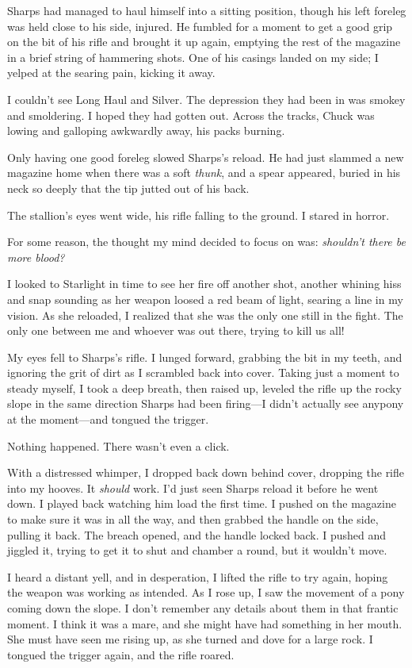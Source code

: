 Sharps had managed to haul himself into a sitting position, though his left foreleg was held close to his side, injured. He fumbled for a moment to get a good grip on the bit of his rifle and brought it up again, emptying the rest of the magazine in a brief string of hammering shots. One of his casings landed on my side; I yelped at the searing pain, kicking it away.

I couldn’t see Long Haul and Silver. The depression they had been in was smokey and smoldering. I hoped they had gotten out. Across the tracks, Chuck was lowing and galloping awkwardly away, his packs burning.

Only having one good foreleg slowed Sharps’s reload. He had just slammed a new magazine home when there was a soft \textit{thunk}, and a spear appeared, buried in his neck so deeply that the tip jutted out of his back.

The stallion’s eyes went wide, his rifle falling to the ground. I stared in horror.

For some reason, the thought my mind decided to focus on was: \textit{shouldn’t there be more blood?}

I looked to Starlight in time to see her fire off another shot, another whining hiss and snap sounding as her weapon loosed a red beam of light, searing a line in my vision. As she reloaded, I realized that she was the only one still in the fight. The only one between me and whoever was out there, trying to kill us all!

My eyes fell to Sharps’s rifle. I lunged forward, grabbing the bit in my teeth, and ignoring the grit of dirt as I scrambled back into cover. Taking just a moment to steady myself, I took a deep breath, then raised up, leveled the rifle up the rocky slope in the same direction Sharps had been firing—I didn’t actually see anypony at the moment—and tongued the trigger.

Nothing happened. There wasn’t even a click.

With a distressed whimper, I dropped back down behind cover, dropping the rifle into my hooves. It \textit{should} work. I’d just seen Sharps reload it before he went down. I played back watching him load the first time. I pushed on the magazine to make sure it was in all the way, and then grabbed the handle on the side, pulling it back. The breach opened, and the handle locked back. I pushed and jiggled it, trying to get it to shut and chamber a round, but it wouldn’t move.

I heard a distant yell, and in desperation, I lifted the rifle to try again, hoping the weapon was working as intended. As I rose up, I saw the movement of a pony coming down the slope. I don’t remember any details about them in that frantic moment. I think it was a mare, and she might have had something in her mouth. She must have seen me rising up, as she turned and dove for a large rock. I tongued the trigger again, and the rifle roared.

